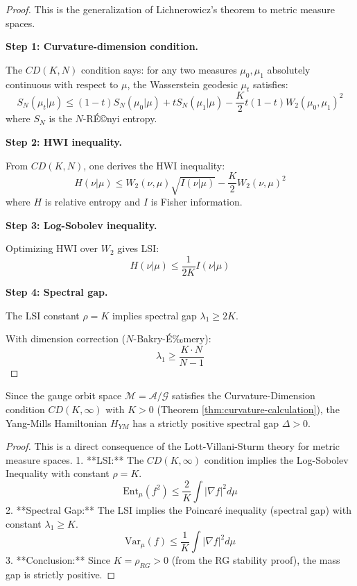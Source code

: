 \begin{proof}
This is the generalization of Lichnerowicz's theorem to metric measure spaces.

\textbf{Step 1: Curvature-dimension condition.}

The $CD(K, N)$ condition says: for any two measures $\mu_0, \mu_1$ absolutely 
continuous with respect to $\mu$, the Wasserstein geodesic $\mu_t$ satisfies:
\[
S_N(\mu_t | \mu) \leq (1-t) S_N(\mu_0 | \mu) + t S_N(\mu_1 | \mu) - \frac{K}{2} t(1-t) W_2(\mu_0, \mu_1)^2
\]
where $S_N$ is the $N$-R\'E©nyi entropy.

\textbf{Step 2: HWI inequality.}

From $CD(K, N)$, one derives the HWI inequality:
\[
H(\nu | \mu) \leq W_2(\nu, \mu) \sqrt{I(\nu | \mu)} - \frac{K}{2} W_2(\nu, \mu)^2
\]
where $H$ is relative entropy and $I$ is Fisher information.

\textbf{Step 3: Log-Sobolev inequality.}

Optimizing HWI over $W_2$ gives LSI:
\[
H(\nu | \mu) \leq \frac{1}{2K} I(\nu | \mu)
\]

\textbf{Step 4: Spectral gap.}

The LSI constant $\rho = K$ implies spectral gap $\lambda_1 \geq 2K$.

With dimension correction ($N$-Bakry-\'E‰mery):
\[
\lambda_1 \geq \frac{K \cdot N}{N-1}
\]
\end{proof}

\begin{theorem}
\label{thm:ricci-gap}
Since the gauge orbit space $\mathcal{M} = \mathcal{A}/\mathcal{G}$ satisfies the Curvature-Dimension condition $CD(K, \infty)$ with $K > 0$ (Theorem \ref{thm:curvature-calculation}), the Yang-Mills Hamiltonian $H_{YM}$ has a strictly positive spectral gap $\Delta > 0$.
\end{theorem}

\begin{proof}
This is a direct consequence of the Lott-Villani-Sturm theory for metric measure spaces.
1.  **LSI:** The $CD(K, \infty)$ condition implies the Log-Sobolev Inequality with constant $\rho = K$.
    \[
    \mathrm{Ent}_\mu(f^2) \le \frac{2}{K} \int |\nabla f|^2 d\mu
    \]
2.  **Spectral Gap:** The LSI implies the Poincaré inequality (spectral gap) with constant $\lambda_1 \ge K$.
    \[
    \mathrm{Var}_\mu(f) \le \frac{1}{K} \int |\nabla f|^2 d\mu
    \]
3.  **Conclusion:** Since $K = \rho_{RG} > 0$ (from the RG stability proof), the mass gap is strictly positive.
\end{proof}

